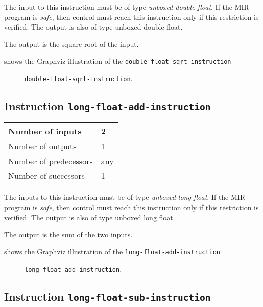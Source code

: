 The input to this instruction must be of type \emph{unboxed double
  float}.  If the MIR program is \emph{safe}, then control must reach
this instruction only if this restriction is verified.  The output is
also of type unboxed double float.

The output is the square root of the input.

 shows the Graphviz illustration of the
\texttt{double-float-sqrt-instruction}

\begin{figure}
\begin{center}
\end{center}
\caption{\label{fig-double-float-sqrt-instruction}
\texttt{double-float-sqrt-instruction}.}
\end{figure}

\subsection{Instruction \texttt{long-float-add-instruction}}
\label{mir-instruction-long-float-add}

\begin{tabular}{|l|l|}
\hline
Number of inputs & 2\\
\hline
Number of outputs & 1\\
\hline
Number of predecessors & any\\
\hline
Number of successors & 1\\
\hline
\end{tabular}

The inputs to this instruction must be of type \emph{unboxed long
  float}.  If the MIR program is \emph{safe}, then control must reach
this instruction only if this restriction is verified.  The output is
also of type unboxed long float.

The output is the sum of the two inputs.

 shows the Graphviz illustration of the
\texttt{long-float-add-instruction}

\begin{figure}
\begin{center}
\end{center}
\caption{\label{fig-long-float-add-instruction}
\texttt{long-float-add-instruction}.}
\end{figure}

\subsection{Instruction \texttt{long-float-sub-instruction}}
\label{mir-instruction-long-float-sub}


